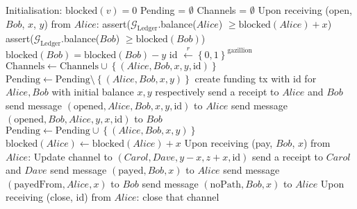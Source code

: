\begin{algorithm}
  \caption{$\mathcal{F}_{\mathrm{PayNet}}$}
  \label{alg:payfunc}
  \begin{algorithmic}[1]
    \State Initialisation:
      \Indent
        \State $\mathrm{blocked}\left(v\right) = 0$
      \EndFor
      \State Pending = $\emptyset$
      \State Channels = $\emptyset$
      \EndIndent
    \State
    \State Upon receiving (open, $Bob$, $x$, $y$) from $Alice$:
        \State assert($\mathcal{G}_{\mathrm{Ledger}}$.balance($Alice$) $\geq
        \mathrm{blocked}\left(Alice\right) + x$)
        \State assert($\mathcal{G}_{\mathrm{Ledger}}$.balance($Bob$) $\geq
        \mathrm{blocked}\left(Bob\right)$)
        \State $\mathrm{blocked}\left(Bob\right) = \mathrm{blocked}\left(Bob\right) - y$
        \State id $\overset{r}{\leftarrow} \left\{0, 1\right\}^{\mathrm{gazillion}}$
        \State $\mathrm{Channels} \leftarrow \mathrm{Channels} \cup \left\{\left(Alice,
        Bob, x, y, \mathrm{id}\right)\right\}$
        \State $\mathrm{Pending} \leftarrow \mathrm{Pending} \setminus \left\{\left(Alice,
        Bob, x, y\right)\right\}$
        \State create funding tx with id for $Alice, Bob$ with initial balance $x, y$
        respectively
        \State send a receipt to $Alice$ and $Bob$
        \State send message $\left(\mathrm{opened}, Alice, Bob, x, y, \mathrm{id}\right)$
        to $Alice$
        \State send message $\left(\mathrm{opened}, Bob, Alice, y, x, \mathrm{id}\right)$
        to $Bob$
      \Else
        \State $\mathrm{Pending} \leftarrow \mathrm{Pending} \cup \left\{\left(Alice, Bob,
        x, y\right)\right\}$
        \State $\mathrm{blocked}\left(Alice\right) \leftarrow
        \mathrm{blocked}\left(Alice\right) + x$
      \EndIf
    \State
    \State Upon receiving (pay, $Bob$, $x$) from $Alice$:
          \State Update channel to $\left(Carol, Dave, y - x, z + x, \mathrm{id}\right)$
          \State send a receipt to $Carol$ and $Dave$
        \EndFor
        \State send message $\left(\mathrm{payed}, Bob, x\right)$ to $Alice$
        \State send message $\left(\mathrm{payedFrom}, Alice, x\right)$ to $Bob$
      \Else
        \State send message $\left(\mathrm{noPath}, Bob, x\right)$ to $Alice$
      \EndIf
    \State
    \State Upon receiving (close, id) from $Alice$:
        \State close that channel
      \EndIf
  \end{algorithmic}
\end{algorithm}
